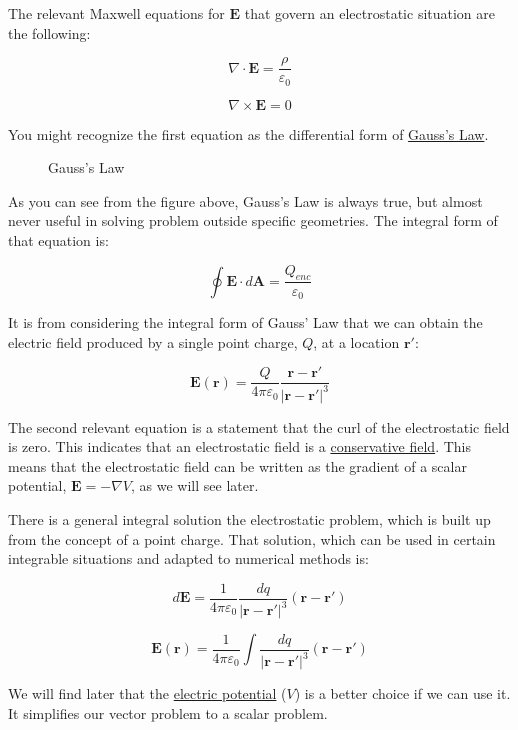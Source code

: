 The relevant Maxwell equations for \(\mathbf{E}\) that govern an
electrostatic situation are the following:

\[\nabla \cdot \mathbf{E} = \frac{\rho}{\varepsilon_0}\]

\[\nabla \times \mathbf{E} = 0\]

You might recognize the first equation as the differential form of
\href{https://en.wikipedia.org/wiki/Gauss\%27s_law}{Gauss's Law}.

\begin{figure}
\centering
\pandocbounded{\texttt{[image: https://subratachak.files.wordpress.com/2017/12/gauss-law-diagram-03.jpg?w=782]}}
\caption{Gauss's Law}
\end{figure}

As you can see from the figure above, Gauss's Law is always true, but
almost never useful in solving problem outside specific geometries. The
integral form of that equation is:

\[\oint \mathbf{E} \cdot d\mathbf{A} = \frac{Q_{enc}}{\varepsilon_0}\]

It is from considering the integral form of Gauss' Law that we can
obtain the electric field produced by a single point charge, \(Q\), at a
location \(\mathbf{r}'\):

\[\mathbf{E}(\mathbf{r}) = \frac{Q}{4\pi\varepsilon_0} \frac{\mathbf{r} - \mathbf{r}'}{|\mathbf{r} - \mathbf{r}'|^3}\]

The second relevant equation is a statement that the curl of the
electrostatic field is zero. This indicates that an electrostatic field
is a
\href{https://en.wikipedia.org/wiki/Conservative_vector_field}{conservative
field}. This means that the electrostatic field can be written as the
gradient of a scalar potential, \(\mathbf{E} = -\nabla V\), as we will
see later.

There is a general integral solution the electrostatic problem, which is
built up from the concept of a point charge. That solution, which can be
used in certain integrable situations and adapted to numerical methods
is:

\[d\mathbf{E} = \frac{1}{4\pi\varepsilon_0} \frac{dq}{|\mathbf{r} - \mathbf{r}'|^3} (\mathbf{r} - \mathbf{r}')\]

\[\mathbf{E}(\mathbf{r}) = \frac{1}{4\pi\varepsilon_0} \int \frac{dq}{|\mathbf{r} - \mathbf{r}'|^3} (\mathbf{r} - \mathbf{r}')\]

We will find later that the
\href{https://en.wikipedia.org/wiki/Electric_potential}{electric
potential} (\(V\)) is a better choice if we can use it. It simplifies
our vector problem to a scalar problem.

